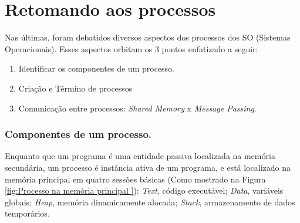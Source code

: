 




\hypertarget{retomando-aos-processos}{%
\chapter{Retomando aos processos}\label{retomando-aos-processos}}

Nas últimas, foram debatidos diversos aspectos dos processos dos SO
(Sistemas Operacionais). Esses aspectos orbitam os 3 pontos enfatizado a
seguir:

\begin{enumerate}
\def\labelenumi{\arabic{enumi}.}

\item
  Identificar os componentes de um processo.
\item
  Criação e Término de processos
\item
  Comunicação entre processos: \emph{Shared Memory} x \emph{Message
  Passing}.
\end{enumerate}

\hypertarget{componentes-de-um-processo.}{%
\subsection{Componentes de um
processo.}\label{componentes-de-um-processo.}}

Enquanto que um programa é uma entidade passiva localizada na memória
secundária, um processo é instância ativa de um programa, e está
localizado na memória principal em quatro sessões básicas (Como mostrado
na Figura \ref{fig:Processo na memória principal }): \emph{Text}, código executável; \emph{Data}, variáveis globais; \emph{Heap}, memória dinamicamente alocada; \emph{Stack},
armazenamento de dados temporários.



